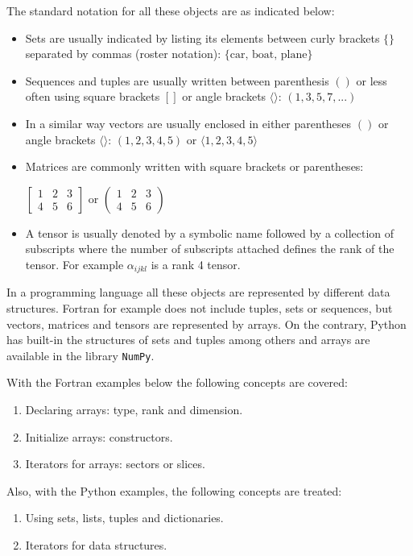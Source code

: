 The standard notation for all these objects are as indicated below:
\begin{itemize}
    \item Sets are usually indicated by listing its elements between curly brackets $\{\}$ separated by commas (roster notation): $\{\textrm{car, boat, plane}\}$
    \item Sequences and tuples are usually written between parenthesis $()$ or less often using square brackets $[]$ or angle brackets $\langle \rangle$: $(1,3,5,7,...)$
    \item In a similar way vectors are usually enclosed in either parentheses $()$ or angle brackets $\langle \rangle$: $(1,2,3,4,5)$ or $\langle1,2,3,4,5 \rangle$
    \item Matrices are commonly written with square brackets or parentheses:
    
    $
    \begin{bmatrix}
        1 & 2 & 3 \\
        4 & 5 & 6
    \end{bmatrix} 
    $ or $
    \begin{pmatrix}
        1 & 2 & 3\\
        4 & 5 & 6
    \end{pmatrix}   
    $
    \item A tensor is usually denoted by a symbolic name followed by a collection of subscripts where the number of subscripts attached defines the rank of the tensor.
    For example $\alpha_{ijkl}$ is a rank 4 tensor.
\end{itemize}

In a programming language all these objects are represented by different data structures.
Fortran for example does not include tuples, sets or sequences, but vectors, matrices and tensors are represented by arrays. 
On the contrary, Python has built-in the structures of sets and tuples among others and arrays are available in the library \texttt{NumPy}.  

With the Fortran examples below the following concepts are covered:
\begin{enumerate}[noitemsep]
    \item Declaring arrays: type, rank and dimension.
    \item Initialize arrays: constructors. 
    \item Iterators for arrays: sectors or slices. 
\end{enumerate}

Also, with the Python examples, the following concepts are treated:
\begin{enumerate}[noitemsep]
    \item Using sets, lists, tuples and dictionaries.
    \item Iterators for data structures.
\end{enumerate}





